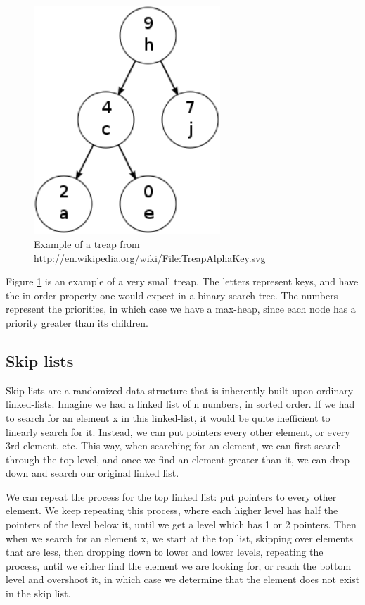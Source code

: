 \documentclass[oribibl]{llncs}
\begin{document}
\begin{figure}[here]
\center
\includegraphics[width=7cm]{images/treap}
\caption{Example of a treap from http://en.wikipedia.org/wiki/File:TreapAlphaKey.svg}
\label{fig:treap}
\end{figure}

Figure \ref{fig:treap} is an example of a very small treap. The letters represent keys, and have the in-order property one would expect in a binary search tree. The numbers represent the priorities, in which case we have a max-heap, since each node has a priority greater than its children.

\subsection{Skip lists}
Skip lists are a randomized data structure that is inherently built upon ordinary linked-lists. Imagine we had a linked list of n numbers, in sorted order. If we had to search for an element x in this linked-list, it would be quite inefficient to linearly search for it. Instead, we can put pointers every other element, or every 3rd element, etc. This way, when searching for an element, we can first search through the top level, and once we find an element greater than it, we can drop down and search our original linked list.

We can repeat the process for the top linked list: put pointers to every other element. We keep repeating this process, where each higher level has half the pointers of the level below it, until we get a level which has 1 or 2 pointers. Then when we search for an element x, we start at the top list, skipping over elements that are less, then dropping down to lower and lower levels, repeating the process, until we either find the element we are looking for, or reach the bottom level and overshoot it, in which case we determine that the element does not exist in the skip list.
\end{document}
